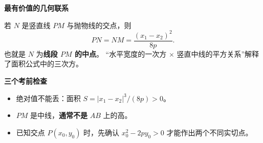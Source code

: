 \begin{summarybox}
    \medskip
    \par\noindent\begin{minipage}{\linewidth}
    \textbf{\textcolor{CSummary}{最有价值的几何联系}}

    若 $N$ 是竖直线 $PM$ 与抛物线的交点，则
    \[
        \boxed{PN=NM=\frac{(x_1-x_2)^2}{8p}}.
    \]
    也就是 $N$ 为\textbf{线段 $PM$ 的中点}。
    “水平宽度的一次方 $\times$ 竖直中线的平方关系”解释了面积公式中的三次方。
    \end{minipage}\par

    \medskip
    \textbf{\textcolor{CSummary}{三个考前检查}}
    \begin{itemize}[leftmargin=*, itemsep=0.3em, topsep=0.3em]
        \item 绝对值不能丢：面积 $S=|x_1-x_2|^3/(8p)>0$。
        \item $PM$ 是中线，\textbf{通常不是} $AB$ 上的高。
        \item 已知交点 $P(x_0,y_0)$ 时，先确认 $x_0^2-2py_0>0$ 才能作出两个不同实切点。
    \end{itemize}
\end{summarybox}
